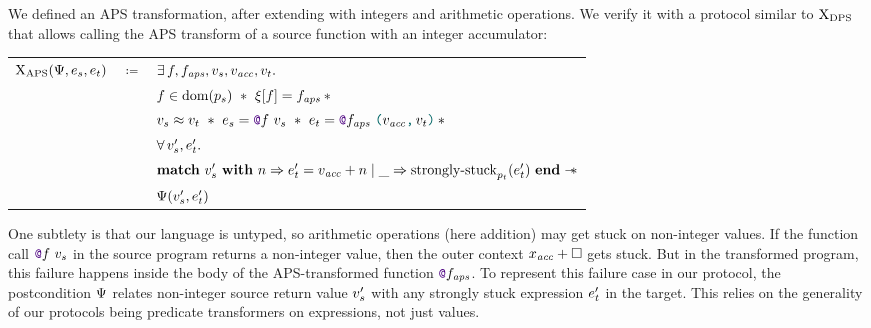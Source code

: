 We defined an APS transformation, after extending \DataLang with integers and arithmetic operations. We verify it with a protocol similar to $\mathrm{X}_\mathrm{DPS}$ that allows calling the APS transform of a source function with an integer accumulator:

\medskip
\begin{tabular}{rcl}
        $\iProt_\mathrm{APS} (\iPredTwo, \datalangExpr_s, \datalangExpr_t)$
        & $\coloneqq$ &
        $\exists \datalangFn, \datalangFn_\mathit{aps}, \datalangVal_s, \datalangVal_\mathit{acc}, \datalangVal_t \ldotp$
    \\
        &&
        $\datalangFn \in \dom{\datalangProg_s}
        \ \iSep\ %
        \datalangRenaming [\datalangFn] = \datalangFn_\mathit{aps}
        \iSep {}$
    \\
        &&
        $\datalangVal_s \iSimilar \datalangVal_t
        \ \iSep\ %
        \datalangExpr_s = \datalangCall{\datalangFnptr{\datalangFn}}{\datalangVal_s}
        \ \iSep\ %
        \datalangExpr_t = \datalangCall{\datalangFnptr{\datalangFn_\mathit{aps}}}{\datalangPair{\datalangVal_\mathit{acc}}{\datalangVal_t}}
        \iSep {}$
    \\
        &&
        $\forall \datalangVal_s', \datalangExpr_t' \ldotp$
    \\
        &&
        $\bm{\mathrm{match}}\ \datalangVal_s'\ \bm{\mathrm{with}}\ \datalangNat \Rightarrow \datalangExpr_t' = \datalangVal_\mathit{acc} + \datalangNat \mid \_ \Rightarrow \mathrm{strongly \mathhyphen stuck}_{\datalangProg_t} (\datalangExpr_t')\ \bm{\mathrm{end}} \iWand$
    \\
        &&
        $\iPredTwo (\datalangVal_s', \datalangExpr_t')$
\end{tabular}
\medskip

One subtlety is that our \DataLang language is untyped, so arithmetic operations (here addition) may get stuck on non-integer values. If the function call $\datalangCall {\datalangFnptr \datalangFn} {\datalangVal_s}$ in the source program returns a non-integer value, then the outer context $\datalangVar_\mathit{acc} + \datalangCtxHole$ gets stuck. But in the transformed program, this failure happens inside the body of the APS-transformed function $\datalangFnptr {\datalangFn_\mathit{aps}}$. To represent this failure case in our protocol, the postcondition $\Psi$ relates non-integer source return value $\datalangVal_s'$ with any strongly stuck expression $\datalangExpr_t'$ in the target. This relies on the generality of our protocols being predicate transformers on expressions, not just values.